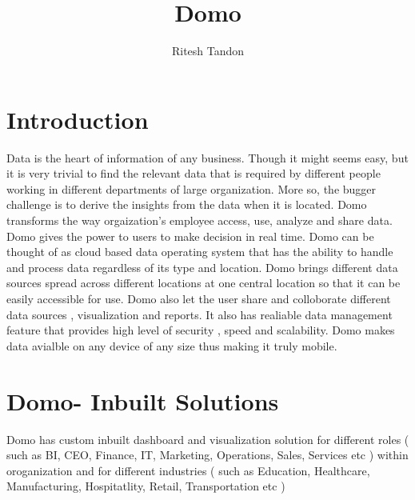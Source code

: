 
\title{Domo}

\author{Ritesh Tandon}

\maketitle

\renewcommand{\shortauthors}{R. Tandon}

\section{Introduction}

Data is the heart of information of any business. 
Though it might seems easy, but it is very trivial 
to find the relevant data that is required by different 
people working in different departments of large organization. 
More so, the bugger challenge is to derive the insights 
from the data when it is located.
Domo transforms the way orgaization's employee access, use, 
analyze and share data. Domo gives the power to users to 
make decision in real time. Domo can be thought of as cloud 
based data operating system that has the ability to handle 
and process data regardless of its type and location. 
Domo brings different data sources spread across different 
locations at one central location so that it can be easily 
accessible for use. Domo also let the user share and 
colloborate different data sources , visualization and 
reports. It also has realiable data management feature 
that provides high level of security , speed and scalability. 
Domo makes data avialble on any device of any size thus 
making it truly mobile.




\section{Domo- Inbuilt Solutions}

Domo has custom inbuilt dashboard and visualization solution 
for different roles ( such as BI, CEO, Finance, IT, Marketing, 
Operations, Sales, Services etc )  within oroganization and 
for different industries ( such as Education, Healthcare, 
Manufacturing, Hospitatlity, Retail, Transportation etc )


